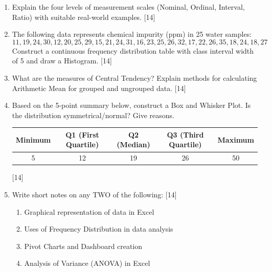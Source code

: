 \documentclass[11pt,a4paper]{article}
\begin{document}
\begin{enumerate}[label=   \textbf{\arabic*.}]
    \item Explain the four levels of measurement scales (Nominal, Ordinal, Interval, Ratio) with suitable real-world examples. \hfill [14]

    \item The following data represents chemical impurity (ppm) in 25 water samples:
    \[
    11, 19, 24, 30, 12, 20, 25, 29, 15, 21, 24, 31, 16, 23, 25, 26, 32, 17, 22, 26, 35, 18, 24, 18, 27
    \]
    Construct a continuous frequency distribution table with class interval width of 5 and draw a Histogram. \hfill [14]

    \item What are the measures of Central Tendency? Explain methods for calculating Arithmetic Mean for grouped and ungrouped data. \hfill [14]

    \item Based on the 5-point summary below, construct a Box and Whisker Plot. Is the distribution symmetrical/normal? Give reasons.
    
\begin{center}
    
\begin{tabular}{|c|c|c|c|c|}
    \hline
   \textbf{Minimum} &   \textbf{Q1 (First Quartile)} &   \textbf{Q2 (Median)} &   \textbf{Q3 (Third Quartile)} &   \textbf{Maximum} \\ \hline
    5 & 12 & 19 & 26 & 50 \\ \hline
    \end{tabular}
    \end{center} \hfill [14]

    \item Write short notes on any TWO of the following: \hfill [14]
    
\begin{enumerate}[label=(\roman*)]
        \item Graphical representation of data in Excel
        \item Uses of Frequency Distribution in data analysis
        \item Pivot Charts and Dashboard creation
        \item Analysis of Variance (ANOVA) in Excel
    \end{enumerate}
\end{enumerate}
\end{document}
